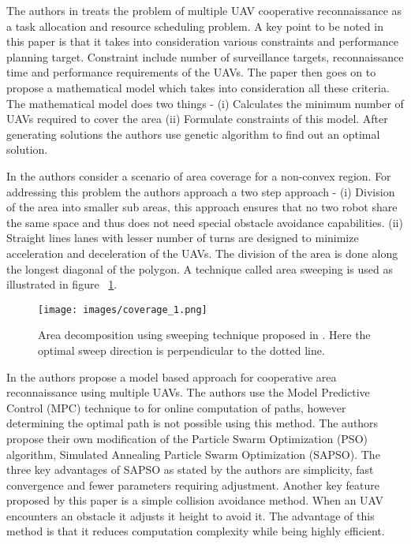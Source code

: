The authors in \cite{10} treats the problem of multiple UAV cooperative reconnaissance as a task allocation and resource scheduling problem. A key point to be noted in this paper is that it takes into consideration various constraints and performance planning target. Constraint include number of surveillance targets, reconnaissance time and performance requirements of the UAVs. The paper then goes on to propose a mathematical model which takes into consideration all these criteria. The mathematical model does two things - (i) Calculates the minimum number of UAVs required to cover the area (ii) Formulate constraints of this model. After generating solutions the authors use genetic algorithm to find out an optimal solution. 

In \cite{2} the authors consider a scenario of area coverage for a non-convex region. For addressing this problem the authors approach a two step approach - (i) Division of the area into smaller sub areas, this approach ensures that no two robot share the same space and thus does not need special obstacle avoidance capabilities. (ii) Straight lines lanes with lesser number of turns are designed 
to minimize acceleration and deceleration of the UAVs. The division of the area is done along the longest diagonal of the polygon. A technique called area sweeping is used as illustrated in figure ~\ref{fig:cvvvvvvv}.
\begin{figure}[htbp] %
 \centering
   \texttt{[image: images/coverage\_1.png]}
   \caption[Area decomposition using sweeping technique \cite{2}]
   {Area decomposition using sweeping technique proposed in \cite{2}. Here the optimal sweep direction is perpendicular to the dotted line.}
   
\label{fig:cvvvvvvv}
\end{figure}

In \cite{3} the authors propose a model based approach for cooperative area reconnaissance using multiple UAVs. The authors use the Model Predictive Control (MPC) technique to for online computation of paths, however determining the optimal path is not possible using this method. The authors propose their own modification of the Particle Swarm Optimization (PSO) algorithm, Simulated Annealing Particle Swarm Optimization (SAPSO). The three key advantages of SAPSO as stated by the authors are simplicity, fast convergence and fewer parameters requiring adjustment. Another key feature proposed by this paper is a simple collision avoidance method. When an UAV encounters an obstacle it adjusts it height to avoid it. The advantage of this method is that it reduces computation complexity while being highly efficient. 

